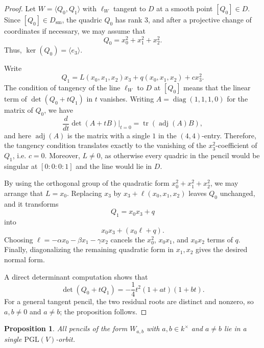 \documentclass[11pt]{article}
\newtheorem{proposition}[theorem]{Proposition}
\newcommand{\PGL}{\mathrm{PGL}}
\begin{document}
\begin{proof}
Let $W=\langle Q_0,Q_1\rangle$ with $\ell_W$ tangent to $D$ at a smooth point $[Q_0]\in D$. Since $[Q_0]\in D_{\mathrm{sm}}$, the quadric $Q_0$ has rank $3$, and after a projective change of coordinates if necessary, we may assume that
\[
Q_0=x_0^2+x_1^2+x_2^2.
\]
Thus, $\ker(Q_0)=\langle e_3\rangle$.

Write
\[
Q_1=L(x_0,x_1,x_2)x_3 + q(x_0,x_1,x_2) + c x_3^2.
\]
The condition of tangency of the line $\ell_W$ to $D$ at $[Q_0]$ means that the linear term of
$\det(Q_0+tQ_1)$
in $t$ vanishes. Writing $A=\operatorname{diag}(1,1,1,0)$ for the matrix of $Q_0$, we have
\[
\frac{d}{dt}\det(A+tB)\big|_{t=0}=\operatorname{tr}(\operatorname{adj}(A)B),
\]
and here $\operatorname{adj}(A)$ is the matrix with a single $1$ in the $(4,4)$-entry. Therefore, the tangency condition translates exactly to the vanishing of the $x_3^2$-coefficient of $Q_1$, i.e. $c=0$. Moreover, $L\neq 0$, as otherwise every quadric in the pencil would be singular at $[0:0:0:1]$ and the line would lie in $D$.

By using the orthogonal group of the quadratic form $x_0^2+x_1^2+x_2^2$, we may arrange that $L=x_0$. Replacing $x_3$ by $x_3+\ell(x_0,x_1,x_2)$ leaves $Q_0$ unchanged, and it transforms
\[
Q_1=x_0x_3+q
\]
into
\[
x_0x_3+(x_0\ell+q).
\]
Choosing $\ell=-\alpha x_0-\beta x_1-\gamma x_2$ cancels the $x_0^2$, $x_0x_1$, and $x_0x_2$ terms of $q$. Finally, diagonalizing the remaining quadratic form in $x_1,x_2$ gives the desired normal form.

A direct determinant computation shows that
\[
\det(Q_0+tQ_1) = -\frac14 t^2(1+at)(1+bt).
\]
For a general tangent pencil, the two residual roots are distinct and nonzero, so $a,b\neq 0$ and $a\neq b$; the proposition follows.
\end{proof}

\begin{proposition}\label{prop:unique-generic-boundary-orbit}
All pencils of the form $W_{a,b}$ with $a,b\in k^\times$ and $a\neq b$ lie in a single $\PGL(V)$-orbit.
\end{proposition}
\end{document}
